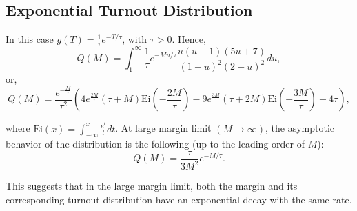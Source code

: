 \documentclass[reprint,aps,prl,showpacs,twocolumn, superscriptaddress]{revtex4-2}
\begin{document}
\subsection{Exponential Turnout Distribution}
In this case $g(T) = \frac{1}{\tau}e^{-T / \tau}$, with $ \tau> 0$. Hence,
\begin{equation}
    Q(M) = \int_{1}^{\infty}\frac{1}{\tau}e^{-Mu / \tau} \frac{u(u - 1)(5u + 7)}{(1 + u)^2 (2 + u)^2}du,
\end{equation}
or,
\begin{equation}
    Q(M) = \frac{e^{-\frac{M}{\tau}}}{\tau^2} \left(4 e^{\frac{2 M}{\tau}} (\tau+M) \text{Ei}\left(-\frac{2 M}{\tau}\right)-9 e^{\frac{3 M}{\tau}} (\tau+2 M) \text{Ei}\left(-\frac{3 M}{\tau}\right)-4 \tau\right), 
\end{equation}

where $\text{Ei}(x) = \int_{-\infty}^{x}\frac{e^t}{t}dt$. At large margin limit $(M \rightarrow \infty)$, the asymptotic behavior of the distribution is the following (up to the leading order of $M$):
\begin{equation}
    Q(M)= \frac{\tau}{3M^2}e^{-M/\tau}.
\end{equation}

This suggests that in the large margin limit, both the margin and its corresponding turnout distribution have an exponential decay with the same rate.
\end{document}
